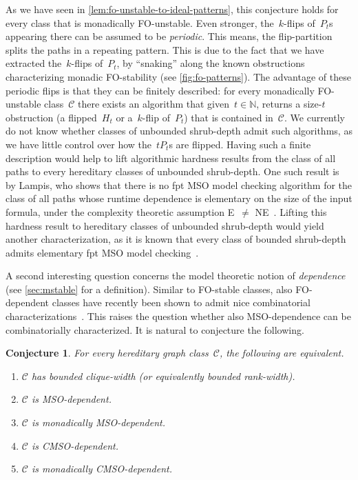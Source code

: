 \documentclass[11pt]{article}      \usepackage[margin=1in]{geometry}  \usepackage{microtype}
\newtheorem{conjecture}[theorem]{Conjecture}
\theoremstyle{definition}
\newcommand{\N}[0]{\mathrm{\mathbb{N}}}
\newcommand{\CC}{\mathcal{C}}
\begin{document}
As we have seen in \cref{lem:fo-unstable-to-ideal-patterns}, this conjecture holds for every class that is monadically FO-unstable.
Even stronger, the~$k$-flips of~$P_t$s appearing there can be assumed to be \emph{periodic}.
This means, the flip-partition splits the paths in a repeating pattern. This is due to the fact that we have extracted the~$k$-flips of~$P_t$, by ``snaking'' along the known obstructions characterizing monadic FO-stability (see \cref{fig:fo-patterns}).
The advantage of these periodic flips is that they can be finitely described:
for every monadically FO-unstable class~$\CC$ there exists an algorithm that given~$t\in\N$, returns a size-$t$ obstruction (a flipped~$H_t$ or a~$k$-flip of~$P_t$) that is contained in~$\CC$.
We currently do not know whether classes of unbounded shrub-depth admit such algorithms, as we have little control over how the~$tP_t$s are flipped.
Having such a finite description would help to lift algorithmic hardness results from the class of all paths to every hereditary classes of unbounded shrub-depth.
One such result is by Lampis, who shows that there is no fpt MSO model checking algorithm for the class of all paths whose runtime dependence is elementary on the size of the input formula, under the complexity theoretic assumption E~$\neq$ NE~\cite{lampis2014lower}.
Lifting this hardness result to hereditary classes of unbounded shrub-depth would yield another characterization, as it is known that every class of bounded shrub-depth admits elementary fpt MSO model checking~\cite{gajarsky2015kernelizing,shrubdepth}.

A second interesting question concerns the model theoretic notion of \emph{dependence} (see \cref{sec:mstable} for a definition).
Similar to FO-stable classes, also FO-dependent classes have recently been shown to admit nice combinatorial characterizations~\cite{dreier2024flipbreakability}.
This raises the question whether also MSO-dependence can be combinatorially characterized.
It is natural to conjecture the following.

\begin{conjecture}\label{conj:cw}
  For every hereditary graph class~$\CC$, the following are equivalent.
  \begin{enumerate}
    \item $\CC$ has bounded clique-width (or equivalently bounded rank-width).
    \item $\CC$ is MSO-dependent.
    \item $\CC$ is monadically MSO-dependent.
    \item $\CC$ is CMSO-dependent.
    \item $\CC$ is monadically CMSO-dependent.
  \end{enumerate}
\end{conjecture}
\end{document}
